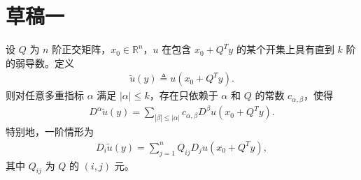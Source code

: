 \documentclass[../../main.tex]{subfiles}%
\begin{document}
\section{草稿一}









\begin{lemma}\label{lemma:高阶链式法则展开}
设 $Q$ 为 $n$ 阶正交矩阵，$x_0\in\mathbb{R}^n$，$u$ 在包含 $x_0+Q^T y$ 的某个开集上具有直到 $k$ 阶的弱导数。定义
\begin{align*}
\tilde u(y)\triangleq u(x_0+Q^T y).
\end{align*}
则对任意多重指标 $\alpha$ 满足 $|\alpha|\leqslant k$，存在只依赖于 $\alpha$ 和 $Q$ 的常数 $c_{\alpha,\beta}$，使得
\begin{align*}
D^\alpha\tilde u(y)=\sum\limits_{|\beta|\leqslant|\alpha|}c_{\alpha,\beta}D^\beta u(x_0+Q^T y).
\end{align*}
特别地，一阶情形为
\begin{align*}
D_i\tilde u(y)=\sum\limits_{j=1}^n Q_{ij}D_j u(x_0+Q^T y),
\end{align*}
其中 $Q_{ij}$ 为 $Q$ 的 $(i,j)$ 元。
\end{lemma}
\end{document}
